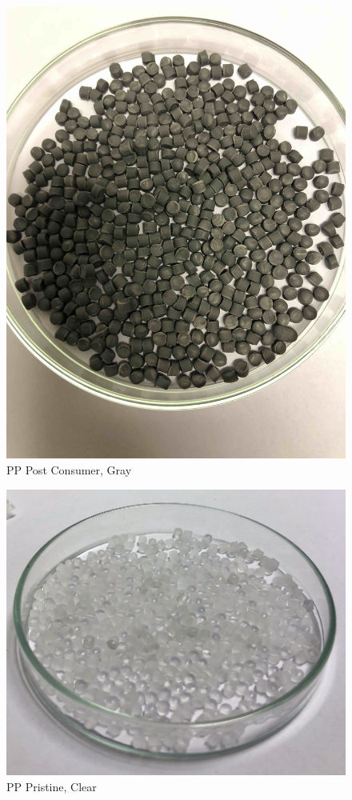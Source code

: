 \begin{appendices}
\begin{figure}
    \centering
    \includegraphics[width = 12cm]{Images/appendix/PP-recyclate-post-consumer.jpg}
    \caption[$\; \:$PP Post Consumer]{PP Post Consumer, Gray}
    \label{fig:pp-gray}
\end{figure}

\begin{figure}
    \centering
    \includegraphics[width = 12cm]{Images/appendix/pp-pristine.png}
    \caption[$\; \:$PP Pristine]{PP Pristine, Clear}
    \label{fig:pp-clear}
\end{figure}


\end{appendices}
